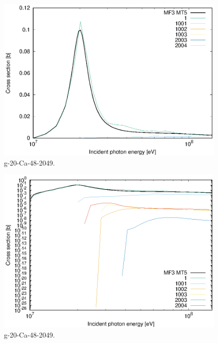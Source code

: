 \begin{figure}
 \includegraphics[width=\linewidth]{eps/g_20-Ca-48_2049.eps}
  \caption{g-20-Ca-48-2049.}
\end{figure}
\begin{figure}
 \includegraphics[width=\linewidth]{eps-log/g_20-Ca-48_2049.eps}
 \caption{g-20-Ca-48-2049.}
\end{figure}
\newpage \clearpage

